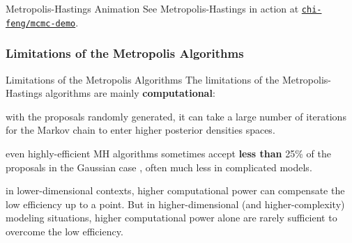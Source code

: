
\begin{frame}{Metropolis-Hastings Animation}
	See Metropolis-Hastings in action at \href{https://chi-feng.github.io/mcmc-demo/app.html?algorithm=RandomWalkMH&target=banana}{\texttt{chi-feng/mcmc-demo}}.
\end{frame}

\subsubsection{Limitations of the Metropolis Algorithms}
\begin{frame}{Limitations of the Metropolis Algorithms}
	The limitations of the Metropolis-Hastings algorithms are mainly \textbf{computational}:
	\begin{vfilleditems}
		\item with the proposals randomly generated,
		it can take a large number of iterations for the
		Markov chain to enter higher posterior densities spaces.
		\item even highly-efficient MH algorithms sometimes accept \textbf{less than}
		25\% of the proposals in the Gaussian case \parencite{robertsWeakConvergenceOptimal1997, beskosOptimalTuningHybrid2013}, often much less in complicated models.
		\item in lower-dimensional contexts, higher computational power can compensate the low efficiency up to a point.
		But in higher-dimensional (and higher-complexity) modeling situations,
		higher computational power alone are rarely sufficient to overcome the low efficiency.
	\end{vfilleditems}
\end{frame}



